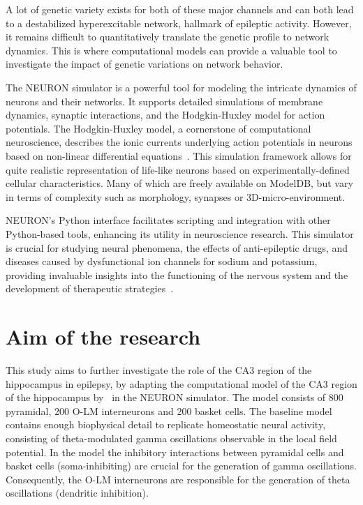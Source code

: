 A lot of genetic variety exists for both of these major channels and can both lead to a destabilized hyperexcitable network, hallmark of epileptic activity.
However, it remains difficult to quantitatively translate the genetic profile to network dynamics.
This is where computational models can provide a valuable tool to investigate the impact of genetic variations on network behavior.

The NEURON simulator is a powerful tool for modeling the intricate dynamics
of neurons and their networks. It supports detailed simulations of membrane
dynamics, synaptic interactions, and the Hodgkin-Huxley model for action
potentials. The Hodgkin-Huxley model, a cornerstone of computational neuroscience,
describes the ionic currents underlying action potentials in neurons based
on non-linear differential equations~\parencite{hodgkinMeasurementCurrentvoltageRelations1952}.
This simulation framework allows for quite realistic representation of life-like neurons based
on experimentally-defined cellular characteristics. Many of which are freely available on ModelDB,
but vary in terms of complexity such as morphology, synapses or 3D-micro-environment.

NEURON's Python interface facilitates scripting and integration
with other Python-based tools, enhancing its utility in neuroscience research.
This simulator is crucial for studying neural phenomena, the effects of
anti-epileptic drugs, and diseases caused by dysfunctional ion channels for sodium and potassium,
providing invaluable insights into the functioning of the nervous system
and the development of therapeutic strategies~\parencite{miglioreParallelNetworkSimulations2006}.
\pagebreak
\section{Aim of the research}
This study aims to further investigate the role of the CA3 region of the hippocampus in epilepsy,
by adapting the computational model of the CA3 region of the hippocampus by~\textcite{neymotinKetamineDisruptsTheta2011} in the NEURON simulator.
The model consists of 800 pyramidal, 200 O-LM interneurons and 200 basket cells.
The baseline model contains enough biophysical detail to replicate homeostatic neural activity, consisting of theta-modulated gamma oscillations observable in the local field potential.
In the model the inhibitory interactions between pyramidal cells and basket cells (soma-inhibiting) are crucial for the generation of gamma oscillations.
Consequently, the O-LM interneurons are responsible for the generation of theta oscillations (dendritic inhibition).

